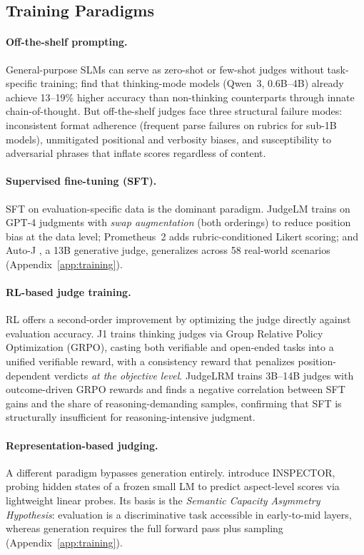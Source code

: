 \documentclass[11pt]{article}
\begin{document}
\subsection{Training Paradigms}

\paragraph{Off-the-shelf prompting.}
General-purpose SLMs can serve as zero-shot or few-shot judges without task-specific training; \citet{jayarao2025explicit} find that thinking-mode models (Qwen~3, 0.6B--4B) already achieve 13--19\% higher accuracy than non-thinking counterparts through innate chain-of-thought. But off-the-shelf judges face three structural failure modes: inconsistent format adherence (frequent parse failures on rubrics for sub-1B models), unmitigated positional and verbosity biases, and susceptibility to adversarial phrases that inflate scores regardless of content.

\paragraph{Supervised fine-tuning (SFT).}
SFT on evaluation-specific data is the dominant paradigm. JudgeLM \citep{zhu2025judgelm} trains on GPT-4 judgments with \emph{swap augmentation} (both orderings) to reduce position bias at the data level; Prometheus~2 \citep{kim2024prometheus2} adds rubric-conditioned Likert scoring; and Auto-J \citep{li2024generative}, a 13B generative judge, generalizes across 58 real-world scenarios (Appendix~\ref{app:training}).

\paragraph{RL-based judge training.}
RL offers a second-order improvement by optimizing the judge directly against evaluation accuracy. J1 \citep{whitehouse2025j1} trains thinking judges via Group Relative Policy Optimization (GRPO), casting both verifiable and open-ended tasks into a unified verifiable reward, with a consistency reward that penalizes position-dependent verdicts \emph{at the objective level}. JudgeLRM \citep{chen2025judgelrm} trains 3B--14B judges with outcome-driven GRPO rewards and finds a negative correlation between SFT gains and the share of reasoning-demanding samples, confirming that SFT is structurally insufficient for reasoning-intensive judgment.

\paragraph{Representation-based judging.}
A different paradigm bypasses generation entirely. \citet{li2026rethinking} introduce INSPECTOR, probing hidden states of a frozen small LM to predict aspect-level scores via lightweight linear probes. Its basis is the \emph{Semantic Capacity Asymmetry Hypothesis}: evaluation is a discriminative task accessible in early-to-mid layers, whereas generation requires the full forward pass plus sampling (Appendix~\ref{app:training}).
\end{document}
